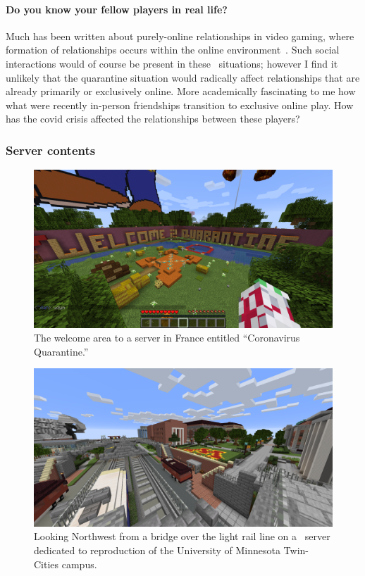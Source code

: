 \documentclass[2020/08/28 v2]{../../../coursework}
\newcommand{\mc}{\citetitle{Minecraft}}
\begin{document}
\paragraph{Do you know your fellow players in real life?}

Much has been written about purely-online relationships in video gaming, where
formation of relationships occurs within the online environment~\parencite{Gallup2016,Marsh2014,Williams2006}.
Such social interactions would of course be present in these \mc\ situations; however
I find it unlikely that the quarantine situation would radically affect relationships
that are already primarily or exclusively online.
More academically fascinating to me how what were recently in-person friendships
transition to exclusive online play. How has the \ac{covid} crisis affected the relationships
between these players?

\subsubsection{Server contents}

\begin{figure}[t]
	\centering
	\includegraphics[width=\textwidth]{screenshot_2020-04-18_91.121.134.152.png}
	\caption{The welcome area to a server in France entitled \enquote{Coronavirus Quarantine.}}
	\label{fig:spawnsign}
\end{figure}

\begin{figure}[t]
	\centering
	\includegraphics[width=\textwidth]{screenshot_2020-04-25_goldycraft.png}
	\caption{Looking Northwest from a bridge over the light rail line on a \mc\ server dedicated to
			reproduction of the University of Minnesota Twin-Cities campus.}
	\label{fig:goldycraft}
\end{figure}
\end{document}

